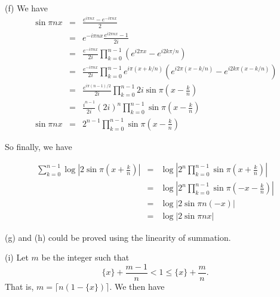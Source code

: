 \documentclass[a4paper,12pt]{article}
\newcommand{\subpar}[1]{\medskip \noindent (#1)}
\begin{document}
\subpar{f} We have
\begin{eqnarray*}
  \sin \pi n x &=& \frac{e^{i\pi nx} - e^{-i\pi nx}}{2} \\
  &=& e^{-i\pi nx} \frac{e^{i2\pi nx} - 1}{2i} \\
  &=& \frac{e^{-i\pi nx}}{2i} \prod_{k=0}^{n-1}(e^{i2\pi x} -
  e^{i2k\pi/n}) \\
  &=& \frac{e^{-i\pi nx}}{2i}
  \prod_{k=0}^{n-1}e^{i\pi(x+k/n)}(e^{i2\pi (x-k/n)} -
  e^{i2k\pi(x-k/n)}) \\
  &=& \frac{e^{i\pi(n-1)/2}}{2i} \prod_{k=0}^{n-1} 2i \sin\pi\left(x
  - \frac{k}{n}\right) \\
  &=& \frac{i^{n-1}}{2i} (2i)^n \prod_{k=0}^{n-1} \sin\pi\left(x
  - \frac{k}{n}\right) \\
  \sin \pi n x &=& 2^{n-1} \prod_{k=0}^{n-1} \sin\pi\left(x
  - \frac{k}{n}\right)
\end{eqnarray*}

So finally, we have

\begin{eqnarray*}
  \sum_{k=0}^{n-1} \log\left|2 \sin\pi \left(x +
  \frac{k}{n}\right)\right| &=& \log \left| 2^n \prod_{k=0}^{n-1}
  \sin\pi \left(x + \frac{k}{n}\right)\right| \\
  &=& \log \left| 2^n \prod_{k=0}^{n-1} \sin\pi\left(-x -
  \frac{k}{n}\right)\right| \\
  &=& \log| 2 \sin\pi n(-x)| \\
  &=& \log| 2 \sin\pi n x|
\end{eqnarray*}

\subpar{g} and \subpar{h} could be proved using the linearity of
summation.

\subpar{i}  Let $m$ be the integer such that
\[ \{x\} + \frac{m-1}{n} < 1 \le \{x\} + \frac{m}{n}.\]
That is, $m = \lceil n(1-\{x\})\rceil$.  We then have
\end{document}

